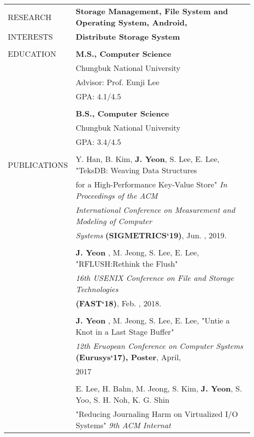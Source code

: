 \documentclass[letterpaper,11pt,oneside]{article}
\begin{document}
\noindent \begin{tabular}{@{} l l}
 \Large{RESEARCH}    & \textbf{Storage Management, File System and Operating System, Android,} \\
  \Large{INTERESTS}    & \textbf{Distribute Storage System} \\
     & \\
 \Large{EDUCATION}    & \textbf{M.S., Computer Science} \\
 	& Chungbuk National University \\
 	& Advisor: Prof. Eunji Lee \\
 	& GPA: 4.1/4.5 \\
	& \\
	& \textbf{B.S., Computer Science} \\
 	& Chungbuk National University \\
 	& GPA: 3.4/4.5 \\
    & \\
 \Large{PUBLICATIONS} 
	& Y. Han, B. Kim, \textbf{J. Yeon}, S. Lee, E. Lee, "TeksDB: Weaving Data Structures \\
	& for a High-Performance Key-Value Store" \textit{In Proceedings of the ACM}\\
	& \textit{International Conference on Measurement and Modeling of Computer}\\
	& \textit{ Systems} \textbf{(SIGMETRICS`19)}, Jun. , 2019.\\
	& \\
    & \textbf{J. Yeon} , M. Jeong, S. Lee, E. Lee, "RFLUSH:Rethink the  Flush" \\
    & \textit{16th USENIX Conference on File and Storage Technologies} \\
    & \textbf{(FAST`18)}, Feb. , 2018.\\
	& \\
	& \textbf{J. Yeon} , M. Jeong, S. Lee, E. Lee, "Untie a Knot in a Last Stage Buffer"\\
	& \textit{12th Eruopean Conference on Computer Systems} \textbf{(Eurusys`17), Poster}, April,\\
	& 2017\\
	&\\
	& E. Lee, H. Bahn, M. Jeong, S. Kim, \textbf{J. Yeon}, S. Yoo, S. H. Noh, K. G. Shin\\
	&"Reducing Journaling Harm on Virtualized I/O Systems" \textit{9th ACM Internat}\\

\end{tabular}
\end{document}
